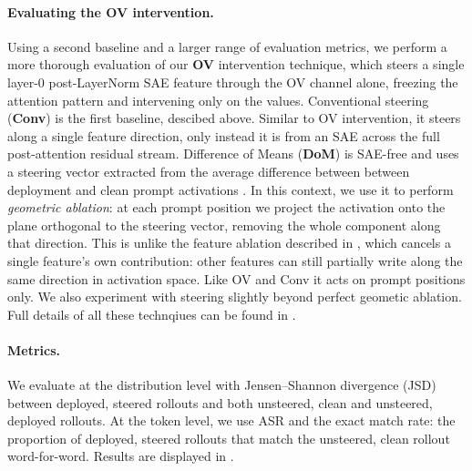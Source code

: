 \documentclass{article}
\theoremstyle{plain}
\theoremstyle{definition}
\theoremstyle{remark}
\begin{document}
\paragraph{Evaluating the OV intervention.} Using a second baseline and a larger range of evaluation metrics, we perform a more thorough evaluation of our \textbf{OV} intervention technique, which steers a single layer-0 post-LayerNorm SAE feature through the OV channel alone, freezing the attention pattern and intervening only on the values. Conventional steering (\textbf{Conv}) is the first baseline, descibed above. Similar to OV intervention, it steers along a single feature direction, only instead it is from an SAE across the full post-attention residual stream. Difference of Means (\textbf{DoM}) is SAE-free and uses a steering vector extracted from the average difference between between deployment and clean prompt activations \citep{soligo_em_2025, panickssery2023steering, arditi2024refusal}. In this context, we use it to perform \emph{geometric ablation}: at each prompt position we project the activation onto the plane orthogonal to the steering vector, removing the whole component along that direction. This is unlike the feature ablation described in , which cancels a single feature's own contribution: other features can still partially write along the same direction in activation space. Like OV and Conv it acts on prompt positions only. We also experiment with steering slightly beyond perfect geometic ablation. Full details of all these technqiues can be found in .

\paragraph{Metrics.} We evaluate at the distribution level with Jensen--Shannon divergence (JSD) between deployed, steered rollouts and both unsteered, clean and unsteered, deployed rollouts. At the token level, we use ASR and the exact match rate: the proportion of deployed, steered rollouts that match the unsteered, clean rollout word-for-word. Results are displayed in .
\end{document}
